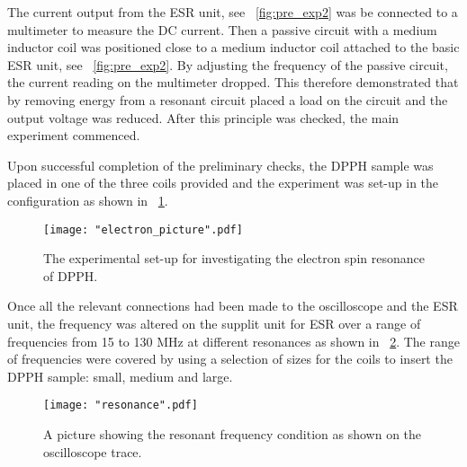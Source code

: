 \documentclass{article}
\newcommand{\figref}[2][\figurename~]{#1\ref{#2}}
\begin{document}
\vspace{2mm}
\noindent
The current output from the ESR unit, see \figref{fig:pre_exp2} was be connected to a multimeter to measure the DC current. Then a passive circuit with a medium inductor coil was positioned close to a medium inductor coil attached to the basic ESR unit, see \figref{fig:pre_exp2}. By adjusting the frequency of the passive circuit, the current reading on the multimeter dropped. This therefore demonstrated that by removing energy from a resonant circuit placed a load on the circuit and the output voltage was reduced. After this principle was checked, the main experiment commenced.

\vspace{2mm}
\noindent
Upon successful completion of the preliminary checks, the DPPH sample was placed in one of the three coils provided and the experiment was set-up in the configuration as shown in \figref{fig:electron_picture}. 

\begin{figure}[h]
\centering
\texttt{[image: "electron\_picture".pdf]}
\caption{The experimental set-up for investigating the electron spin resonance of DPPH.}
\label{fig:electron_picture}
\end{figure}

\vspace{2mm}
\noindent
Once all the relevant connections had been made to the oscilloscope and the ESR unit, the frequency was altered on the supplit unit for ESR over a range of frequencies from 15 to 130 MHz \cite{Paper02} at different resonances as shown in \figref{fig:resonance}. The range of frequencies were covered by using a selection of sizes for the coils to insert the DPPH sample: small, medium and large.

\begin{figure}[h]
\centering
\texttt{[image: "resonance".pdf]}
\caption{A picture showing the resonant frequency condition as shown on the oscilloscope trace.}
\label{fig:resonance}
\end{figure}
\end{document}
